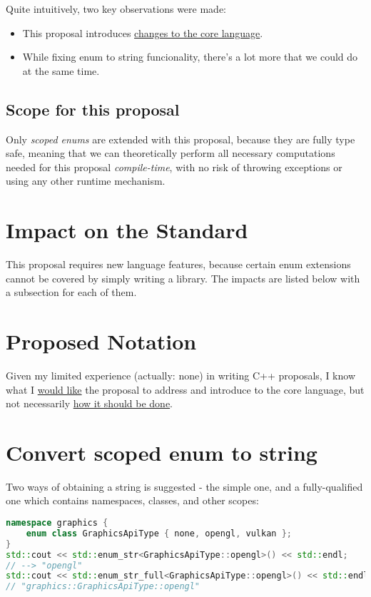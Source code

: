 \documentclass[
  format=manuscript,
  screen=true,
  review=false,
  nonacm=true,
  timestamp=true,
  balance=false]{acmart}
\begin{document}
\noindent
Quite intuitively, two key observations were made:

\begin{itemize}
\item This proposal introduces \underline{changes to the core language}.
\item While fixing enum to string funcionality, there's a lot more that we could do at the same time.
\end{itemize}

\subsection{Scope for this proposal}

Only \textit{scoped enums} are extended with this proposal, because they are fully
type safe, meaning that we can theoretically perform all necessary computations needed
for this proposal \textit{compile-time}, with no risk of throwing exceptions or using
any other runtime mechanism.


\section{Impact on the Standard}

This proposal requires new language features, because certain enum extensions cannot
be covered by simply writing a library. The impacts are listed below with a subsection
for each of them.


\section{Proposed Notation}

Given my limited experience (actually: none) in writing C++ proposals, I know what I
\underline{would like} the proposal to address and introduce to the core language,
but not necessarily \underline{how it should be done}.

\section{Convert scoped enum to string}

Two ways of obtaining a string is suggested - the simple one, and a fully-qualified
one which contains namespaces, classes, and other scopes:\vspace{2mm}

\begin{lstlisting}[language=Cpp]
namespace graphics {
    enum class GraphicsApiType { none, opengl, vulkan };
}
std::cout << std::enum_str<GraphicsApiType::opengl>() << std::endl;
// --> "opengl"
std::cout << std::enum_str_full<GraphicsApiType::opengl>() << std::endl;
// "graphics::GraphicsApiType::opengl"
\end{lstlisting}
\end{document}
